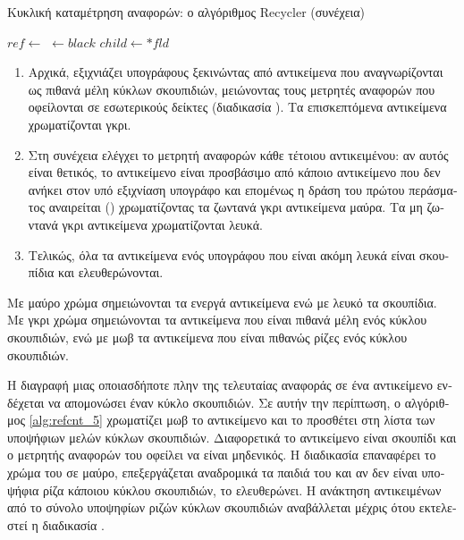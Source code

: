 \begin{greek}
\begin{algorithm}
  \ContinuedFloat
  \caption{Κυκλική καταμέτρηση αναφορών: ο αλγόριθμος Recycler (συνέχεια)}
  \begin{algorithmic}
        \State $ref \gets$ 
        \State {}
      \EndWhile
    \EndProcedure
    \Statex
        \State {} $\gets black$ 
          \State $child \gets *fld$
            \State {}
          \EndIf
        \EndFor
        \State {}
     \EndIf
   \EndProcedure
  \end{algorithmic}
\end{algorithm}

\begin{enumerate}
  \item Αρχικά, εξιχνιάζει υπογράφους ξεκινώντας από αντικείμενα
    που αναγνωρίζονται ως πιθανά μέλη κύκλων σκουπιδιών,
    μειώνοντας τους μετρητές αναφορών που οφείλονται σε
    εσωτερικούς δείκτες (διαδικασία \textenglish{}).
    Τα επισκεπτόμενα αντικείμενα χρωματίζονται γκρι.
  \item Στη συνέχεια ελέγχει το μετρητή αναφορών κάθε τέτοιου
    αντικειμένου: αν αυτός είναι θετικός, το αντικείμενο είναι
    προσβάσιμο από κάποιο αντικείμενο που δεν ανήκει στον υπό
    εξιχνίαση υπογράφο και επομένως η δράση του πρώτου περάσματος
    αναιρείται (\textenglish{}) χρωματίζοντας τα ζωντανά γκρι αντικείμενα
    μαύρα. Τα μη ζωντανά γκρι αντικείμενα χρωματίζονται λευκά.
  \item Τελικώς, όλα τα αντικείμενα ενός υπογράφου που είναι
    ακόμη λευκά είναι σκουπίδια και ελευθερώνονται.
\end{enumerate}

Με μαύρο χρώμα σημειώνονται τα ενεργά αντικείμενα ενώ με
λευκό τα σκουπίδια. Με γκρι χρώμα σημειώνονται τα αντικείμενα
που είναι πιθανά μέλη ενός κύκλου σκουπιδιών, ενώ με μωβ τα
αντικείμενα που είναι πιθανώς ρίζες ενός κύκλου σκουπιδιών.

Η διαγραφή μιας οποιασδήποτε πλην της τελευταίας αναφοράς σε
ένα αντικείμενο ενδέχεται να απομονώσει έναν κύκλο σκουπιδιών.
Σε αυτήν την περίπτωση, ο αλγόριθμος \ref{alg:refcnt_5}
χρωματίζει μωβ το αντικείμενο και το προσθέτει στη λίστα των
υποψήφιων μελών κύκλων σκουπιδιών. Διαφορετικά το αντικείμενο
είναι σκουπίδι και ο μετρητής αναφορών του οφείλει να είναι
μηδενικός. Η διαδικασία \textenglish{} επαναφέρει το χρώμα
του σε μαύρο, επεξεργάζεται αναδρομικά τα παιδιά του και αν
δεν είναι υποψήφια ρίζα κάποιου κύκλου σκουπιδιών, το
ελευθερώνει. Η ανάκτηση αντικειμένων από το σύνολο υποψηφίων
ριζών κύκλων σκουπιδιών αναβάλλεται μέχρις ότου εκτελεστεί
η διαδικασία \textenglish{}. 


\end{greek}
